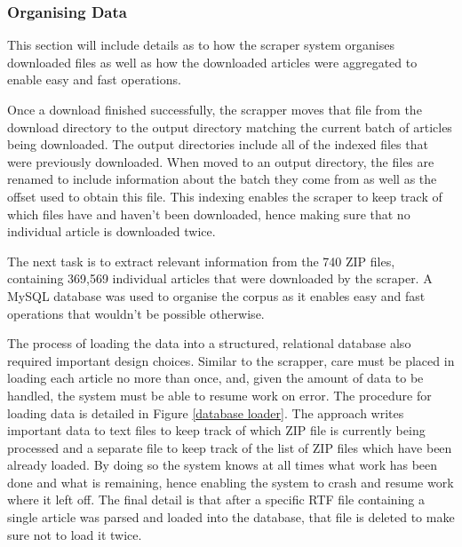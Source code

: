 \subsubsection{Organising Data}

This section will include details as to how the scraper system organises downloaded files as well as how the downloaded articles were aggregated to enable easy and fast operations.

Once a download finished successfully, the scrapper moves that file from the download directory to the output directory matching the current batch of articles being downloaded. The output directories include all of the indexed files that were previously downloaded. When moved to an output directory, the files are renamed to include information about the batch they come from as well as the offset used to obtain this file. This indexing enables the scraper to keep track of which files have and haven't been downloaded, hence making sure that no individual article is downloaded twice.

The next task is to extract relevant information from the 740 ZIP files, containing 369,569 individual articles that were downloaded by the scraper. A MySQL database was used to organise the corpus as it enables easy and fast operations that wouldn't be possible otherwise.

The process of loading the data into a structured, relational database also required important design choices. Similar to the scrapper, care must be placed in loading each article no more than once, and, given the amount of data to be handled, the system must be able to resume work on error. The procedure for loading data is detailed in Figure \ref{database loader}. The approach writes important data to text files to keep track of which ZIP file is currently being processed and a separate file to keep track of the list of ZIP files which have been already loaded. By doing so the system knows at all times what work has been done and what is remaining, hence enabling the system to crash and resume work where it left off. The final detail is that after a specific RTF file containing a single article was parsed and loaded into the database, that file is deleted to make sure not to load it twice.

